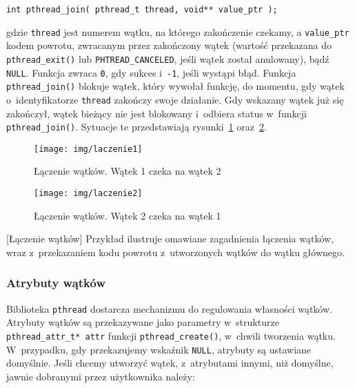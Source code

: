 \begin{lstlisting}[style=MyCStyle]
int pthread_join( pthread_t thread, void** value_ptr );
\end{lstlisting}

gdzie \lstinline[style=MyCStyle]{thread} jest numerem wątku, na którego zakończenie czekamy, a \lstinline[style=MyCStyle]{value_ptr} kodem powrotu, zwracanym przez zakończony wątek (wartość przekazana do \lstinline[style=MyCStyle]{pthread_exit()} lub \lstinline[style=MyCStyle]{PHTREAD_CANCELED}, jeśli wątek został anulowany), bądź \lstinline[style=MyCStyle]{NULL}. Funkcja zwraca \lstinline[style=MyCStyle]{0}, gdy sukces i~\lstinline[style=MyCStyle]{-1}, jeśli wystąpi błąd. Funkcja \lstinline[style=MyCStyle]{pthread_join()} blokuje wątek, który wywołał funkcję, do momentu, gdy wątek o~identyfikatorze \lstinline[style=MyCStyle]{thread} zakończy swoje działanie. Gdy wskazany wątek już się zakończył, wątek bieżący nie jest blokowany i~odbiera status w~funkcji \lstinline[style=MyCStyle]{pthread_join()}. Sytuacje te przedstawiają rysunki~\ref{fig:laczenie1} oraz~\ref{fig:laczenie2}.

\begin{figure}[!h]
\centering
\texttt{[image: img/laczenie1]}
\caption{Łączenie wątków. Wątek 1 czeka na wątek 2}
\label{fig:laczenie1}
\end{figure}
\begin{figure}[!h]
\centering
\texttt{[image: img/laczenie2]}
\caption{Łączenie wątków. Wątek 2 czeka na wątek 1}
\label{fig:laczenie2}
\end{figure}

\begin{example}{[Łączenie wątków]}
Przykład ilustruje omawiane zagadnienia łączenia wątków, wraz z~przekazaniem kodu powrotu z~utworzonych wątków do wątku głównego.



\end{example}


\subsubsection{Atrybuty wątków}

Biblioteka \lstinline[style=MyCStyle]{pthread} dostarcza mechanizmu do regulowania własności wątków. Atrybuty wątków są przekazywane jako parametry w~strukturze \lstinline[style=MyCStyle]{pthread_attr_t* attr} funkcji \lstinline[style=MyCStyle]{pthread_create()}, w~chwili tworzenia wątku. W~przypadku, gdy przekazujemy wskaźnik \lstinline[style=MyCStyle]{NULL}, atrybuty są ustawiane domyślnie. Jeśli chcemy utworzyć wątek, z~atrybutami innymi, niż domyślne, jawnie dobranymi przez użytkownika należy:


